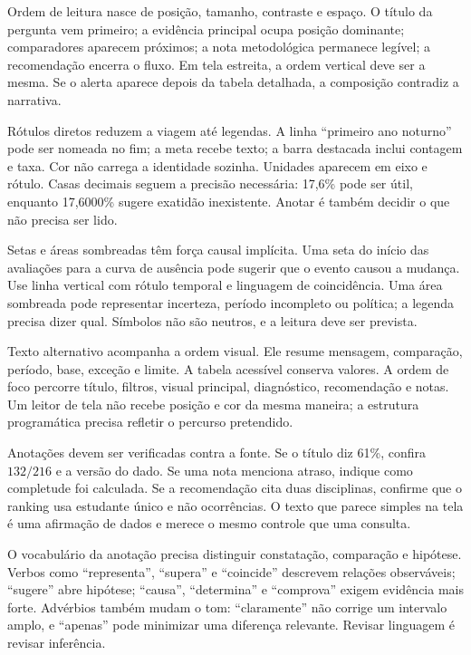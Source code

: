 Ordem de leitura nasce de posição, tamanho, contraste e espaço. O título da pergunta vem primeiro; a evidência principal ocupa posição dominante; comparadores aparecem próximos; a nota metodológica permanece legível; a recomendação encerra o fluxo. Em tela estreita, a ordem vertical deve ser a mesma. Se o alerta aparece depois da tabela detalhada, a composição contradiz a narrativa.

Rótulos diretos reduzem a viagem até legendas. A linha ``primeiro ano noturno'' pode ser nomeada no fim; a meta recebe texto; a barra destacada inclui contagem e taxa. Cor não carrega a identidade sozinha. Unidades aparecem em eixo e rótulo. Casas decimais seguem a precisão necessária: 17,6\% pode ser útil, enquanto 17,6000\% sugere exatidão inexistente. Anotar é também decidir o que não precisa ser lido.

Setas e áreas sombreadas têm força causal implícita. Uma seta do início das avaliações para a curva de ausência pode sugerir que o evento causou a mudança. Use linha vertical com rótulo temporal e linguagem de coincidência. Uma área sombreada pode representar incerteza, período incompleto ou política; a legenda precisa dizer qual. Símbolos não são neutros, e a leitura deve ser prevista.

Texto alternativo acompanha a ordem visual. Ele resume mensagem, comparação, período, base, exceção e limite. A tabela acessível conserva valores. A ordem de foco percorre título, filtros, visual principal, diagnóstico, recomendação e notas. Um leitor de tela não recebe posição e cor da mesma maneira; a estrutura programática precisa refletir o percurso pretendido.

Anotações devem ser verificadas contra a fonte. Se o título diz 61\%, confira $132/216$ e a versão do dado. Se uma nota menciona atraso, indique como completude foi calculada. Se a recomendação cita duas disciplinas, confirme que o ranking usa estudante único e não ocorrências. O texto que parece simples na tela é uma afirmação de dados e merece o mesmo controle que uma consulta.

O vocabulário da anotação precisa distinguir constatação, comparação e hipótese. Verbos como ``representa'', ``supera'' e ``coincide'' descrevem relações observáveis; ``sugere'' abre hipótese; ``causa'', ``determina'' e ``comprova'' exigem evidência mais forte. Advérbios também mudam o tom: ``claramente'' não corrige um intervalo amplo, e ``apenas'' pode minimizar uma diferença relevante. Revisar linguagem é revisar inferência.

